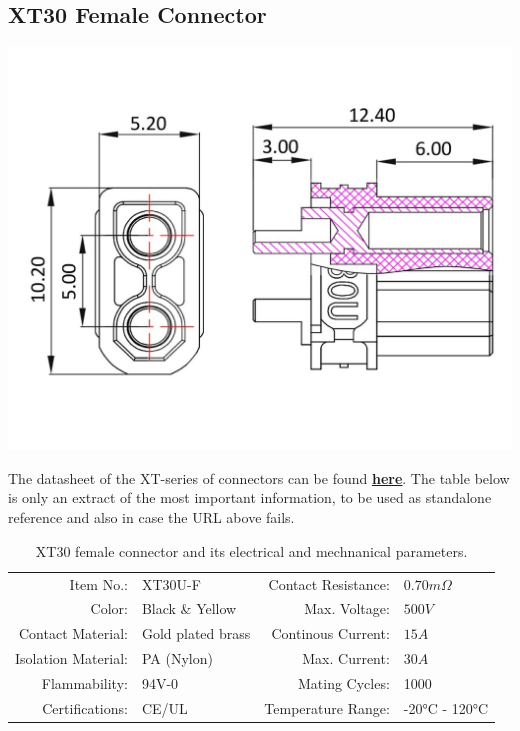\subsection{XT30 Female Connector}

\includegraphics[width=\textwidth]{contents/figures/xt30_f.jpg}

The datasheet of the XT-series of connectors can be found \href{https://www.lcsc.com/datasheet/lcsc_datasheet_2304140030_Changzhou-Amass-Elec-XT30U-F_C99102.pdf}{\textbf{\underline{here}}}.
The table below is only an extract of the most important information, to be used as standalone reference and also in case the URL above fails.

\begin{table}[h] %
    \begin{tabular}{rlrl}
         Item No.:&  XT30U-F &  Contact Resistance:& $0.70m \Omega$\\
         Color:&  Black \& Yellow&  Max. Voltage:& $500V$\\
         Contact Material:&  Gold plated brass&  Continous Current:& $15A$\\
         Isolation Material:&  PA (Nylon)&  Max. Current:& $30A$\\
         Flammability:&  94V-0&  Mating Cycles:& 1000\\
         Certifications:&  CE/UL&  Temperature Range:& -20°C - 120°C\\
    \end{tabular}
    \caption{XT30 female connector and its electrical and mechnanical parameters.}
    \label{tab:xt30_f_specs}
\end{table}

